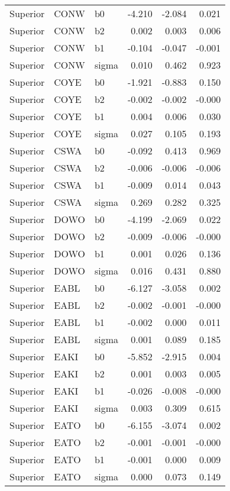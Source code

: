 \begin{table}[ht]
\begin{center}
\begin{tabular}{lllrrr}
  Superior & CONW & b0 & -4.210 & -2.084 & 0.021 \\ 
  Superior & CONW & b2 & 0.002 & 0.003 & 0.006 \\ 
  Superior & CONW & b1 & -0.104 & -0.047 & -0.001 \\ 
  Superior & CONW & sigma & 0.010 & 0.462 & 0.923 \\ 
  Superior & COYE & b0 & -1.921 & -0.883 & 0.150 \\ 
  Superior & COYE & b2 & -0.002 & -0.002 & -0.000 \\ 
  Superior & COYE & b1 & 0.004 & 0.006 & 0.030 \\ 
  Superior & COYE & sigma & 0.027 & 0.105 & 0.193 \\ 
  Superior & CSWA & b0 & -0.092 & 0.413 & 0.969 \\ 
  Superior & CSWA & b2 & -0.006 & -0.006 & -0.006 \\ 
  Superior & CSWA & b1 & -0.009 & 0.014 & 0.043 \\ 
  Superior & CSWA & sigma & 0.269 & 0.282 & 0.325 \\ 
  Superior & DOWO & b0 & -4.199 & -2.069 & 0.022 \\ 
  Superior & DOWO & b2 & -0.009 & -0.006 & -0.000 \\ 
  Superior & DOWO & b1 & 0.001 & 0.026 & 0.136 \\ 
  Superior & DOWO & sigma & 0.016 & 0.431 & 0.880 \\ 
  Superior & EABL & b0 & -6.127 & -3.058 & 0.002 \\ 
  Superior & EABL & b2 & -0.002 & -0.001 & -0.000 \\ 
  Superior & EABL & b1 & -0.002 & 0.000 & 0.011 \\ 
  Superior & EABL & sigma & 0.001 & 0.089 & 0.185 \\ 
  Superior & EAKI & b0 & -5.852 & -2.915 & 0.004 \\ 
  Superior & EAKI & b2 & 0.001 & 0.003 & 0.005 \\ 
  Superior & EAKI & b1 & -0.026 & -0.008 & -0.000 \\ 
  Superior & EAKI & sigma & 0.003 & 0.309 & 0.615 \\ 
  Superior & EATO & b0 & -6.155 & -3.074 & 0.002 \\ 
  Superior & EATO & b2 & -0.001 & -0.001 & -0.000 \\ 
  Superior & EATO & b1 & -0.001 & 0.000 & 0.009 \\ 
  Superior & EATO & sigma & 0.000 & 0.073 & 0.149 \\ 

\end{tabular}
\end{center}
\end{table}
